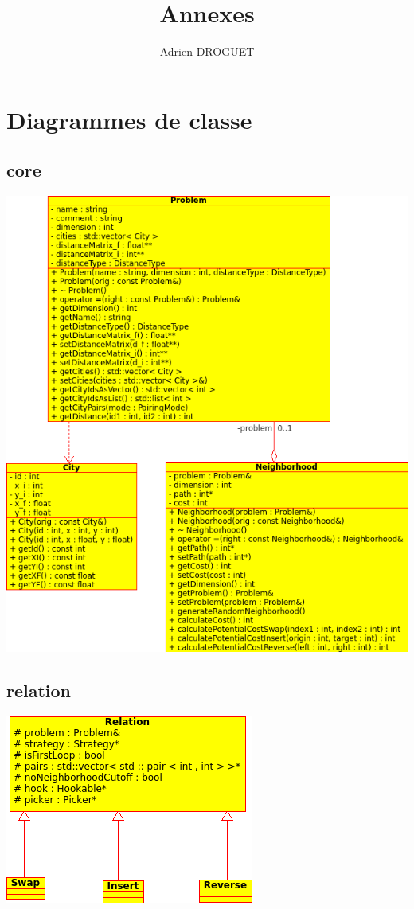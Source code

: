 \documentclass[a4paper,10pt]{report}
\title{Annexes}
\author{Adrien DROGUET}
\begin{document}
\maketitle

\tableofcontents
\pagebreak

\chapter{Diagrammes de classe}

\section{core}
\includegraphics[width=\textwidth]{../UML/core.png}

\section{relation}
\includegraphics[width=\textwidth]{../UML/relation-simple.png}
\end{document}
